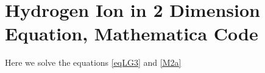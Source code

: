 \chapter{ Hydrogen Ion in 2 Dimension Equation, Mathematica Code }
\label{AppendixC}

Here we solve the equations \eqref{eqLG3} and \eqref{M2a}





